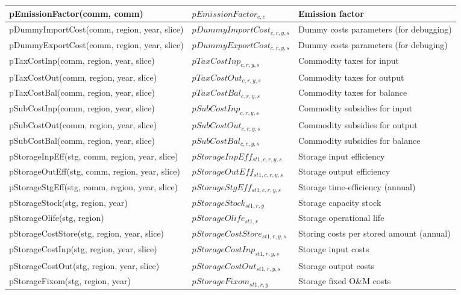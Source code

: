 \documentclass{article}
\begin{document}
\begin{longtable}{|p{10cm}|p{5cm}|p{9cm}|}
 \hline
pEmissionFactor(comm, comm) & $pEmissionFactor_{c,c}$ & Emission factor \\ 
 \hline
pDummyImportCost(comm, region, year, slice) & $pDummyImportCost_{c,r,y,s}$ & Dummy costs parameters (for debugging) \\ 
 \hline
pDummyExportCost(comm, region, year, slice) & $pDummyExportCost_{c,r,y,s}$ & Dummy costs parameters (for debuging) \\ 
 \hline
pTaxCostInp(comm, region, year, slice) & $pTaxCostInp_{c,r,y,s}$ & Commodity taxes for input \\ 
 \hline
pTaxCostOut(comm, region, year, slice) & $pTaxCostOut_{c,r,y,s}$ & Commodity taxes for output \\ 
 \hline
pTaxCostBal(comm, region, year, slice) & $pTaxCostBal_{c,r,y,s}$ & Commodity taxes for balance \\ 
 \hline
pSubCostInp(comm, region, year, slice) & $pSubCostInp_{c,r,y,s}$ & Commodity subsidies for input \\ 
 \hline
pSubCostOut(comm, region, year, slice) & $pSubCostOut_{c,r,y,s}$ & Commodity subsidies for output \\ 
 \hline
pSubCostBal(comm, region, year, slice) & $pSubCostBal_{c,r,y,s}$ & Commodity subsidies for balance \\ 
 \hline
pStorageInpEff(stg, comm, region, year, slice) & $pStorageInpEff_{st1,c,r,y,s}$ & Storage input efficiency \\ 
 \hline
pStorageOutEff(stg, comm, region, year, slice) & $pStorageOutEff_{st1,c,r,y,s}$ & Storage output efficiency \\ 
 \hline
pStorageStgEff(stg, comm, region, year, slice) & $pStorageStgEff_{st1,c,r,y,s}$ & Storage time-efficiency (annual) \\ 
 \hline
pStorageStock(stg, region, year) & $pStorageStock_{st1,r,y}$ & Storage capacity stock \\ 
 \hline
pStorageOlife(stg, region) & $pStorageOlife_{st1,r}$ & Storage operational life \\ 
 \hline
pStorageCostStore(stg, region, year, slice) & $pStorageCostStore_{st1,r,y,s}$ & Storing costs per stored amount (annual) \\ 
 \hline
pStorageCostInp(stg, region, year, slice) & $pStorageCostInp_{st1,r,y,s}$ & Storage input costs \\ 
 \hline
pStorageCostOut(stg, region, year, slice) & $pStorageCostOut_{st1,r,y,s}$ & Storage output costs \\ 
 \hline
pStorageFixom(stg, region, year) & $pStorageFixom_{st1,r,y}$ & Storage fixed O\&M costs \\ 

\end{longtable}
\end{document}
